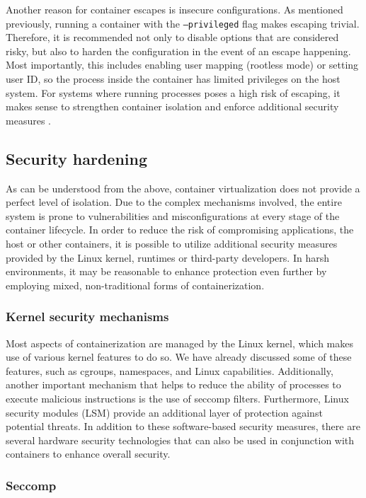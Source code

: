 Another reason for container escapes is insecure configurations. As mentioned previously, running a container with the \texttt{--privileged} flag makes escaping trivial. Therefore, it is recommended not only to disable options that are considered risky, but also to harden the configuration in the event of an escape happening. Most importantly, this includes enabling user mapping (rootless mode) or setting user ID, so the process inside the container has limited privileges on the host system. For systems where running processes poses a high risk of escaping, it makes sense to strengthen container isolation and enforce additional security measures \cite{book:rice}.

\subsection{Security hardening}

As can be understood from the above, container virtualization does not provide a perfect level of isolation. Due to the complex mechanisms involved, the entire system is prone to vulnerabilities and misconfigurations at every stage of the container lifecycle. In order to reduce the risk of compromising applications, the host or other containers, it is possible to utilize additional security measures provided by the Linux kernel, runtimes or third-party developers. In harsh environments, it may be reasonable to enhance protection even further by employing mixed, non-traditional forms of containerization.

\subsubsection{Kernel security mechanisms}

Most aspects of containerization are managed by the Linux kernel, which makes use of various kernel features to do so. We have already discussed some of these features, such as cgroups, namespaces, and Linux capabilities. Additionally, another important mechanism that helps to reduce the ability of processes to execute malicious instructions is the use of seccomp filters. Furthermore, Linux security modules (LSM) provide an additional layer of protection against potential threats. In addition to these software-based security measures, there are several hardware security technologies that can also be used in conjunction with containers to enhance overall security.

\subsubsection*{Seccomp}

